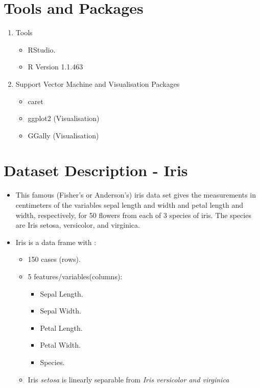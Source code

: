 \documentclass[a4paper,10pt]{article}
\begin{document}
\pagebreak
\section{Tools and Packages}
\begin{enumerate}
	\item Tools
	\begin{itemize}
		\item RStudio.
		\item R Version 1.1.463
	\end{itemize}
	\item Support Vector Machine and Visualisation Packages
	\begin{itemize}
		\item caret
		\item ggplot2 (Visualisation)
		\item GGally (Visualisation)
	\end{itemize}				
\end{enumerate}

\section{Dataset Description - Iris}
\begin{itemize}
	\item This famous (Fisher's or Anderson's) iris data set gives the measurements in centimeters of the variables sepal length and width and petal length and width, respectively, for 50 flowers from each of 3 species of iris. The species are Iris setosa, versicolor, and virginica.
	
	\item Iris is a data frame with :
	\begin{itemize}
		\item 150 cases (rows).
		\item 5 features/variables(columns):
		\begin{itemize}
			\item Sepal Length.
			\item Sepal Width.
			\item Petal Length.
			\item Petal Width.
			\item Species.
		\end{itemize}
	   \item  Iris \textit{setosa} is linearly separable from \textit{ Iris versicolor and virginica}
	\end{itemize} 	
\end{itemize}
\end{document}
